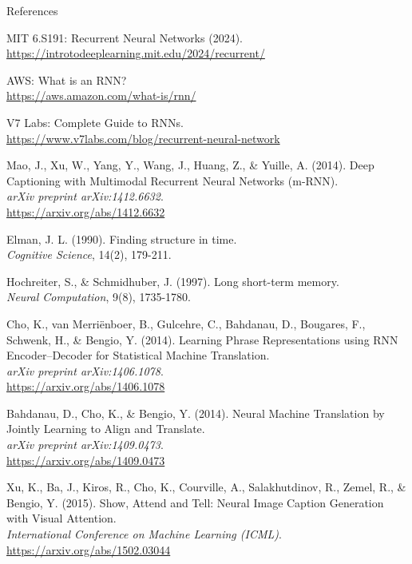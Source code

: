 \begin{frame}[allowframebreaks]{References}
\begin{thebibliography}{99}

MIT 6.S191: Recurrent Neural Networks (2024).\\
\url{https://introtodeeplearning.mit.edu/2024/recurrent/}

AWS: What is an RNN?\\
\url{https://aws.amazon.com/what-is/rnn/}

V7 Labs: Complete Guide to RNNs.\\
\url{https://www.v7labs.com/blog/recurrent-neural-network}

Mao, J., Xu, W., Yang, Y., Wang, J., Huang, Z., \& Yuille, A. (2014). Deep Captioning with Multimodal Recurrent Neural Networks (m-RNN).\\
\textit{arXiv preprint arXiv:1412.6632}.\\
\url{https://arxiv.org/abs/1412.6632}

Elman, J. L. (1990). Finding structure in time.\\
\textit{Cognitive Science}, 14(2), 179-211.

Hochreiter, S., \& Schmidhuber, J. (1997). Long short-term memory.\\
\textit{Neural Computation}, 9(8), 1735-1780.

Cho, K., van Merriënboer, B., Gulcehre, C., Bahdanau, D., Bougares, F., Schwenk, H., \& Bengio, Y. (2014). Learning Phrase Representations using RNN Encoder–Decoder for Statistical Machine Translation.\\
\textit{arXiv preprint arXiv:1406.1078}.\\
\url{https://arxiv.org/abs/1406.1078}

Bahdanau, D., Cho, K., \& Bengio, Y. (2014). Neural Machine Translation by Jointly Learning to Align and Translate.\\
\textit{arXiv preprint arXiv:1409.0473}.\\
\url{https://arxiv.org/abs/1409.0473}

Xu, K., Ba, J., Kiros, R., Cho, K., Courville, A., Salakhutdinov, R., Zemel, R., \& Bengio, Y. (2015). Show, Attend and Tell: Neural Image Caption Generation with Visual Attention.\\
\textit{International Conference on Machine Learning (ICML)}.\\
\url{https://arxiv.org/abs/1502.03044}


\end{thebibliography}
\end{frame}
